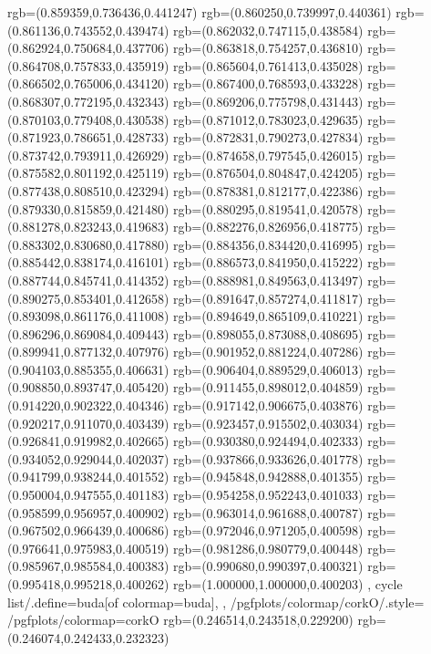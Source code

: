 {{{			rgb=(0.859359,0.736436,0.441247)
			rgb=(0.860250,0.739997,0.440361)
			rgb=(0.861136,0.743552,0.439474)
			rgb=(0.862032,0.747115,0.438584)
			rgb=(0.862924,0.750684,0.437706)
			rgb=(0.863818,0.754257,0.436810)
			rgb=(0.864708,0.757833,0.435919)
			rgb=(0.865604,0.761413,0.435028)
			rgb=(0.866502,0.765006,0.434120)
			rgb=(0.867400,0.768593,0.433228)
			rgb=(0.868307,0.772195,0.432343)
			rgb=(0.869206,0.775798,0.431443)
			rgb=(0.870103,0.779408,0.430538)
			rgb=(0.871012,0.783023,0.429635)
			rgb=(0.871923,0.786651,0.428733)
			rgb=(0.872831,0.790273,0.427834)
			rgb=(0.873742,0.793911,0.426929)
			rgb=(0.874658,0.797545,0.426015)
			rgb=(0.875582,0.801192,0.425119)
			rgb=(0.876504,0.804847,0.424205)
			rgb=(0.877438,0.808510,0.423294)
			rgb=(0.878381,0.812177,0.422386)
			rgb=(0.879330,0.815859,0.421480)
			rgb=(0.880295,0.819541,0.420578)
			rgb=(0.881278,0.823243,0.419683)
			rgb=(0.882276,0.826956,0.418775)
			rgb=(0.883302,0.830680,0.417880)
			rgb=(0.884356,0.834420,0.416995)
			rgb=(0.885442,0.838174,0.416101)
			rgb=(0.886573,0.841950,0.415222)
			rgb=(0.887744,0.845741,0.414352)
			rgb=(0.888981,0.849563,0.413497)
			rgb=(0.890275,0.853401,0.412658)
			rgb=(0.891647,0.857274,0.411817)
			rgb=(0.893098,0.861176,0.411008)
			rgb=(0.894649,0.865109,0.410221)
			rgb=(0.896296,0.869084,0.409443)
			rgb=(0.898055,0.873088,0.408695)
			rgb=(0.899941,0.877132,0.407976)
			rgb=(0.901952,0.881224,0.407286)
			rgb=(0.904103,0.885355,0.406631)
			rgb=(0.906404,0.889529,0.406013)
			rgb=(0.908850,0.893747,0.405420)
			rgb=(0.911455,0.898012,0.404859)
			rgb=(0.914220,0.902322,0.404346)
			rgb=(0.917142,0.906675,0.403876)
			rgb=(0.920217,0.911070,0.403439)
			rgb=(0.923457,0.915502,0.403034)
			rgb=(0.926841,0.919982,0.402665)
			rgb=(0.930380,0.924494,0.402333)
			rgb=(0.934052,0.929044,0.402037)
			rgb=(0.937866,0.933626,0.401778)
			rgb=(0.941799,0.938244,0.401552)
			rgb=(0.945848,0.942888,0.401355)
			rgb=(0.950004,0.947555,0.401183)
			rgb=(0.954258,0.952243,0.401033)
			rgb=(0.958599,0.956957,0.400902)
			rgb=(0.963014,0.961688,0.400787)
			rgb=(0.967502,0.966439,0.400686)
			rgb=(0.972046,0.971205,0.400598)
			rgb=(0.976641,0.975983,0.400519)
			rgb=(0.981286,0.980779,0.400448)
			rgb=(0.985967,0.985584,0.400383)
			rgb=(0.990680,0.990397,0.400321)
			rgb=(0.995418,0.995218,0.400262)
			rgb=(1.000000,1.000000,0.400203)
		},
	cycle list/.define={buda}{[of colormap=buda]},
	},
	/pgfplots/colormap/corkO/.style={
		/pgfplots/colormap={corkO}{%
			rgb=(0.246514,0.243518,0.229200)
			rgb=(0.246074,0.242433,0.232323)
}}}
